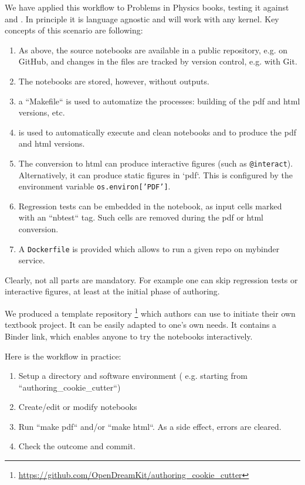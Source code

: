 \documentclass{deliverablereport}
\begin{document}
{{{We have applied this workflow to Problems in Physics books, testing it
against \SageMath and \Python. In principle it is language agnostic
and will work with any \Jupyter kernel. Key concepts of this scenario
are following:

\begin{enumerate}
\item As above, the source notebooks are available in a public
  repository, e.g. on GitHub, and changes in the files are tracked
  by version control, e.g. with Git.
\item The notebooks are stored, however, without outputs.
\item a ``Makefile`` is used to automatize the processes: building of
  the pdf and html versions, etc.
\item \nbconvert is used to automatically execute and clean notebooks
  and to produce the pdf and html versions.
\item The conversion to html can produce interactive figures (such as
  \texttt{@interact}). Alternatively, it can produce static figures in
  `pdf`. This is configured by the environment variable
  \texttt{os.environ['PDF']}.
\item Regression tests can be embedded in the notebook, as input cells
  marked with an ``nbtest`` tag. Such cells are removed during the pdf
  or html conversion.
\item A \texttt{Dockerfile} is provided which allows to run a given
  repo on mybinder service.
\end{enumerate}

Clearly, not all parts are mandatory. For example one can skip
regression tests or interactive figures, at least at the initial phase
of authoring.

We produced a template repository \footnote{\scriptsize
  \url{https://github.com/OpenDreamKit/authoring_cookie_cutter}} which
authors can use to initiate their own textbook project. It can be
easily adapted to one's own needs. It contains a Binder link, which
enables anyone to try the notebooks interactively.

Here is the workflow in practice:
\begin{enumerate}
\item Setup a directory and software environment ( e.g. starting from
  ``authoring\_cookie\_cutter``)
\item Create/edit or modify notebooks
\item Run ``make pdf`` and/or ``make html``. As a side effect, errors
  are cleared.
\item Check the outcome and commit.
\end{enumerate}

}}}
\end{document}

